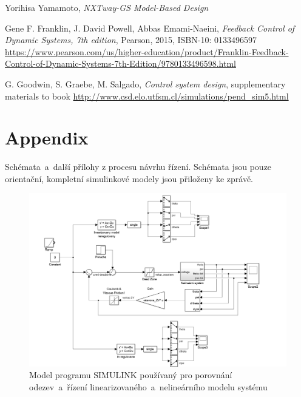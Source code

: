 \documentclass[conference]{IEEEtran}
\begin{document}
\begin{thebibliography}{9}
    
    Yorihisa Yamamoto, \emph{NXTway-GS Model-Based Design} 
    
     Gene F. Franklin, J. David Powell, Abbas Emami-Naeini, \emph{Feedback Control of Dynamic Systems, 7th edition}, Pearson, 2015, ISBN-10: 0133496597 \url{https://www.pearson.com/us/higher-education/product/Franklin-Feedback-Control-of-Dynamic-Systems-7th-Edition/9780133496598.html}
    
     G. Goodwin, S. Graebe, M. Salgado, \emph{Control system design}, supplementary materials to book \url{http://www.csd.elo.utfsm.cl/simulations/pend_sim5.html}
    
\end{thebibliography}

\section{Appendix}

Schémata~a~další přílohy z procesu návrhu řízení. Schémata jsou pouze orientační, kompletní simulinkové modely jsou přiloženy ke zprávě.

\begin{figure}[htbp]
    \centerline{\includegraphics[width=\linewidth]{simulace_simulink.png}}
    \caption{Model programu SIMULINK používaný pro porovnání odezev~a~řízení linearizovaného~a~nelineárního modelu systému}
    \label{fig:simulink_simulace}        
\end{figure}
\end{document}
